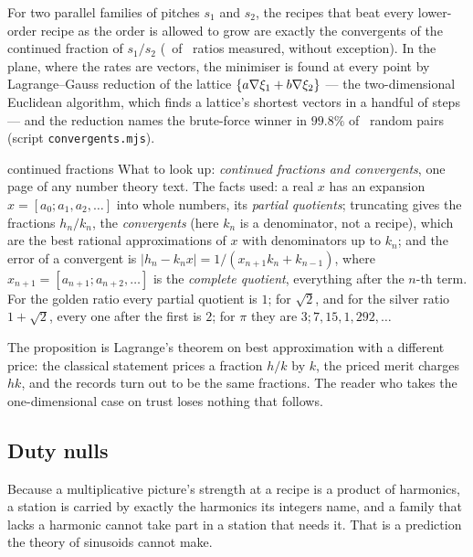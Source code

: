 \begin{proposition}
\label{prop:selection}
For two parallel families of pitches $s_1$ and $s_2$, the recipes that beat
every lower-order recipe as the order is allowed to grow are exactly the
convergents of the continued fraction of $s_1/s_2$ (\selRecordsMatch\ of
\selRatios\ ratios measured, without exception). In the plane, where the
rates are vectors, the minimiser is found at every point by
Lagrange--Gauss reduction of the lattice $\{a\nabla\xi_1+b\nabla\xi_2\}$
--- the two-dimensional Euclidean algorithm, which finds a lattice's
shortest vectors in a handful of steps~\cite{NguyenStehle2009Gauss} ---
and the reduction names the brute-force winner in $99.8\%$ of
\selTrials\ random pairs (script \texttt{convergents.mjs}).
\end{proposition}

\begin{lookup}{continued fractions}
What to look up: \emph{continued fractions and convergents}, one page of
any number theory text. The facts used: a real $x$ has an expansion
$x=[a_0;a_1,a_2,\dots]$ into whole numbers, its \emph{partial quotients};
truncating gives the fractions $h_n/k_n$, the \emph{convergents} (here
$k_n$ is a denominator, not a recipe), which are the best rational
approximations of $x$ with denominators up to $k_n$; and the error of a
convergent is $|h_n-k_nx|=1/(x_{n+1}k_n+k_{n-1})$, where
$x_{n+1}=[a_{n+1};a_{n+2},\dots]$ is the \emph{complete quotient},
everything after the $n$-th term. For the golden ratio every partial
quotient is $1$; for $\sqrt2$, and for the silver ratio $1+\sqrt2$, every
one after the first is $2$; for $\pi$ they are $3;7,15,1,292,\dots$
\end{lookup}

The proposition is Lagrange's theorem on best approximation with a
different price: the classical statement prices a fraction $h/k$ by $k$,
the priced merit charges $hk$, and the records turn out to be the same
fractions. The reader who takes the one-dimensional case on trust loses
nothing that follows.

\subsection{Duty nulls}
\label{sec:dutynull}

Because a multiplicative picture's strength at a recipe is a product of
harmonics, a station is carried by exactly the harmonics its integers name,
and a family that lacks a harmonic cannot take part in a station that needs
it. That is a prediction the theory of sinusoids cannot make.

